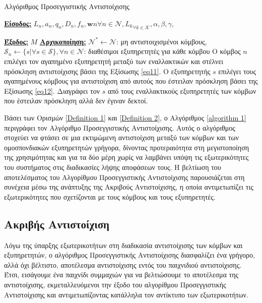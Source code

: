 \begin{algorithm}[h]
\caption{Αλγόριθμος Προσεγγιστικής Αντιστοίχισης} \label{algorithm 1}
\begin{algorithmic}[1]
\STATE \textbf{\underline{Είσοδος:}} ${L_n, a_n, q_n, D_n, f_n, \mathbf{w}n}{\forall n\in \mathcal{N}}, {L_k}_{\forall k \in \mathcal{K}}, \alpha,\beta,\gamma$,

\STATE \textbf{\underline{Έξοδος:}}  $M$
\STATE \textbf{\underline{Αρχικοποίηση:}} $\mathcal{N}^* \gets \mathcal{N}$: μη αντιστοιχισμένοι κόμβους, $\mathcal{S}_n \gets \{ s | \forall s \in \mathcal{S}\}, \forall n \in \mathcal{N}$: διαθέσιμοι εξυπηρετητές για κάθε κόμβου
\STATE Ο κόμβος $n$ επιλέγει τον αγαπημένο εξυπηρετητή μεταξύ των εναλλακτικών και στέλνει πρόσκληση αντιστοίχισης βάσει της Εξίσωσης \ref{eq11}.
\ENDFOR
{}
\STATE Ο εξυπηρετητής $s$ επιλέγει τους αγαπημένους κόμβους για αντιστοίχιση από αυτούς που έστειλαν πρόσκληση βάσει της Εξίσωσης \ref{eq12}.
\STATE Διαγράφει τον $s$ από τους εναλλακτικούς εξυπηρετητές των κόμβων που έστειλαν πρόσκληση αλλά δεν έγιναν δεκτοί.
\ENDIF
\ENDFOR
\ENDWHILE
\end{algorithmic}
\end{algorithm}
\vspace{-7pt}
Βάσει των Ορισμών \ref{Definition 1} και \ref{Definition 2}, ο Αλγόριθμος \ref{algorithm 1} περιγράφει τον Αλγόριθμο Προσεγγιστικής Αντιστοίχισης. Αυτός ο αλγόριθμος στοχεύει να φτάσει σε μια εκτιμώμενη αντιστοίχιση μεταξύ των κόμβων και των ομοσπονδιακών εξυπηρετητών γρήγορα, δίνοντας προτεραιότητα στη μεγιστοποίηση της χρησιμότητας και για τα δύο μέρη χωρίς να λαμβάνει υπόψη τις εξωτερικότητες του συστήματος στις διαδικασίες λήψης αποφάσεων τους. Η βελτίωση του αποτελέσματος του Αλγορίθμου Προσεγγιστικής Αντιστοίχισης παρουσιάζεται στη συνέχεια μέσω της ανάπτυξης της Ακριβούς Αντιστοίχισης, η οποία αντιμετωπίζει τις εξωτερικότητες που σχετίζονται με τους κόμβους και τους εξυπηρετητές.

\subsection{Ακριβής Αντιστοίχιση}

Λόγω της ύπαρξης εξωτερικοτήτων στη διαδικασία αντιστοίχισης των κόμβων και εξυπηρετητών, ο αλγόριθμος Προσεγγιστικής Αντιστοίχισης διασφαλίζει ένα γρήγορο, αλλά όχι βέλτιστο, αποτέλεσμα αντιστοίχισης εντός του παιχνιδιού αντιστοίχισης. Έτσι, εισάγουμε ένα παιχνίδι συμμαχιών για να βελτιώσουμε το αποτέλεσμα της αντιστοίχισης, εκμεταλλευόμενοι την έξοδο του αλγορίθμου Προσεγγιστικής Αντιστοίχισης και αντιμετωπίζοντας κατάλληλα τον αντίκτυπο των εξωτερικοτήτων.

